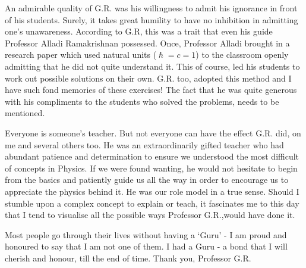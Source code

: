 An admirable quality of G.R. was his willingness to admit his ignorance in front of
his students. Surely, it takes great humility to have no inhibition in admitting one’s
unawareness. According to G.R, this was a trait that even his guide Professor Alladi
Ramakrishnan possessed. Once, Professor Alladi brought in a research paper which
used natural units ($\hslash = c = 1$) to the classroom openly admitting that he did not quite
understand it. This of course, led his students to work out possible solutions on their
own. G.R. too, adopted this method and I have such fond memories of these exercises!
The fact that he was quite generous with his compliments to the students who solved
the problems, needs to be mentioned.


Everyone is someone's teacher. But not everyone can have the effect G.R. did, on
me and several others too. He was an extraordinarily gifted teacher who had abundant
patience and determination to ensure we understood the most difficult of concepts in
Physics. If we were found wanting, he would not hesitate to begin from the basics and
patiently guide us all the way in order to encourage us to appreciate the physics behind
it. He was our role model in a true sense. Should I stumble upon a complex concept
to explain or teach, it fascinates me to this day that I tend to visualise all the possible
ways Professor G.R.,would have done it.


Most people go through their lives without having a ‘Guru’ - I am proud and honoured to say that I am not one of them. I had a Guru - a bond that I will cherish and
honour, till the end of time. Thank you, Professor G.R.

